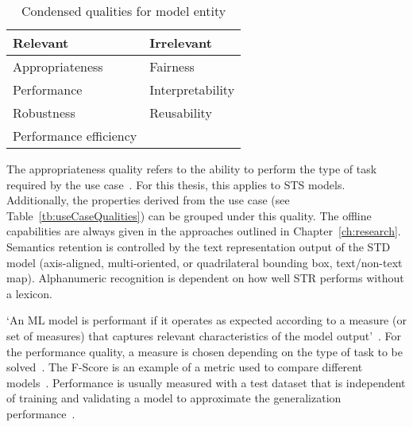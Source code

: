 \begin{table}[h]
    \centering\scriptsize
    \begin{tabular}{l l}
        \textbf{Relevant}                & \textbf{Irrelevant} \\
        \toprule
        Appropriateness         & Fairness  \\
        Performance             & Interpretability \\
        Robustness              & Reusability \\
        Performance efficiency  & \\
    \end{tabular}
    \caption{Condensed qualities for model entity\label{tb:condensedQualities}}
\end{table}

The appropriateness quality refers to the ability to perform the type of task required by
the use case~\citep{siebert_construction_2021,nakamichi_requirements-driven_2020}.
For this thesis, this applies to \ac{STS} models.
Additionally, the properties derived from the use case (see
Table~\ref{tb:useCaseQualities}) can be grouped under this quality.
The offline capabilities are always given in the approaches outlined in Chapter~\ref{ch:research}.
Semantics retention is controlled by the text representation output of the \ac{STD} model (axis-aligned,
multi-oriented, or quadrilateral bounding box, text/non-text map).
Alphanumeric recognition is dependent on how well \ac{STR} performs without a lexicon.

`An ML model is performant if it operates as expected according to a measure (or set of measures)
that captures relevant characteristics of the model output'~\citep{ashmore_assuring_2021}.
For the performance quality, a measure is chosen depending on the type of task to be
solved~\citep{siebert_construction_2021}.
The F-Score is an example of a metric used to compare different
models~\citep{chen_text_2021, long_scene_2021}.
Performance is usually measured with a test dataset that is independent of training and validating
a model to approximate the generalization performance~\citep{goodfellow_deep_2016,
nakamichi_requirements-driven_2020}.

